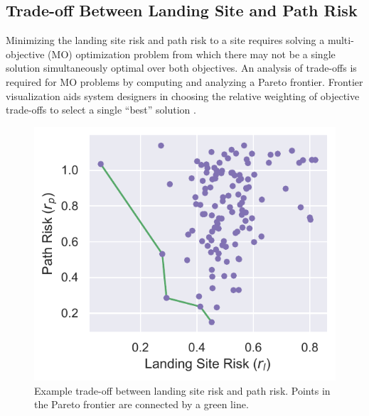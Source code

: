 \subsection{Trade-off Between Landing Site and Path Risk}\label{sec:ch5_trade-off}
Minimizing the landing site risk and path risk to a site requires solving a multi-objective (MO) optimization problem from which there may not be a single solution simultaneously optimal over both objectives. An analysis of trade-offs is required for MO problems by computing and analyzing a Pareto frontier. Frontier visualization aids system designers in choosing the relative weighting of objective trade-offs to select a single ``best'' solution \cite{ngatchou_pareto_2005}. 

\begin{figure}[h!]
\centering
\includegraphics[width=.5\linewidth]{chapter_5_mapping/imgs/witten_Scenario1_pareto.pdf}
\caption[Example Pareto frontier for risk]{Example trade-off between landing site risk and path risk. Points in the Pareto frontier are connected by a green line.}
\label{fig:ch5_pareto_example}
\end{figure}

